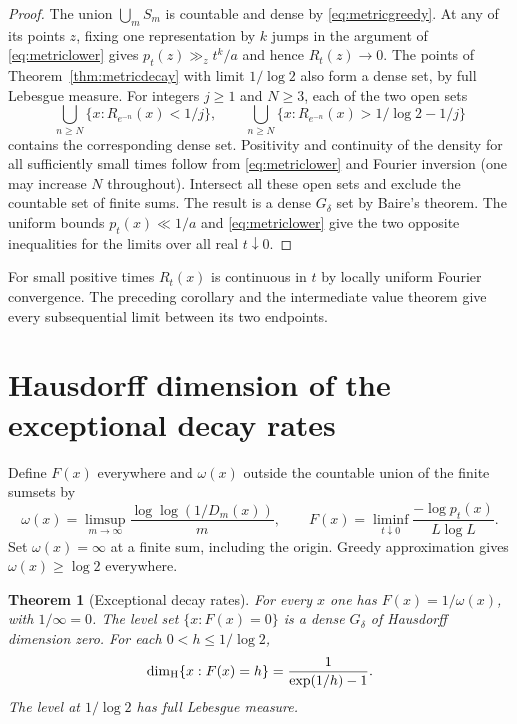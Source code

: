 \documentclass[11pt]{article}
\newtheorem{theorem}{Theorem}[section]
\theoremstyle{remark}\newtheorem{remark}[theorem]{Remark}
\begin{document}
\begin{proof}
The union $\bigcup_m S_m$ is countable and dense by
\eqref{eq:metricgreedy}. At any of its points $z$, fixing one representation
by $k$ jumps in the argument of \eqref{eq:metriclower} gives
$p_t(z)\gg_z t^k/a$ and hence $R_t(z)\to0$.
The points of Theorem~\ref{thm:metricdecay} with limit $1/\log 2$
also form a dense set, by full Lebesgue measure. For integers $j\ge1$ and
$N\ge3$, each of the two open sets
\[
 \bigcup_{n\ge N}\{x:R_{e^{-n}}(x)<1/j\},\qquad
 \bigcup_{n\ge N}\{x:R_{e^{-n}}(x)>1/\log2-1/j\}
\]
contains the corresponding dense set. Positivity and continuity of the density
for all sufficiently small times follow from \eqref{eq:metriclower} and
Fourier inversion (one may increase $N$ throughout). Intersect all these
open sets and exclude the countable set of finite sums. The result is a
dense $G_\delta$ set by Baire's theorem. The uniform bounds
$p_t(x)\ll1/a$ and \eqref{eq:metriclower} give the two opposite inequalities
for the limits over all real $t\downarrow0$.
\end{proof}
For small positive times $R_t(x)$ is continuous in $t$ by locally uniform
Fourier convergence. The preceding corollary and the intermediate value theorem
give every subsequential limit between its two endpoints.
\section{Hausdorff dimension of the exceptional decay rates}
\label{sec:dimension}
Define $F(x)$ everywhere and $\omega(x)$ outside the countable union of the finite sumsets by
\[
 \omega(x)=\limsup_{m\to\infty}
      \frac{\log\log(1/D_m(x))}{m},\qquad
 F(x)=\liminf_{t\downarrow0}\frac{-\log p_t(x)}{L\log L}.
\]
Set $\omega(x)=\infty$ at a finite sum, including the origin. Greedy
approximation gives $\omega(x)\ge\log2$ everywhere.

\begin{theorem}[Exceptional decay rates]\label{thm:dimension}
For every $x$ one has $F(x)=1/\omega(x)$, with $1/\infty=0$.
The level set $\{x:F(x)=0\}$ is a dense $G_\delta$ of Hausdorff dimension zero.
For each $0<h\le 1/\log2$,
\[
 \dim_{\rm H}\{x:F(x)=h\}
    =\frac{1}{\exp(1/h)-1}.
\]
The level at $1/\log2$ has full Lebesgue measure.
\end{theorem}
\end{document}
